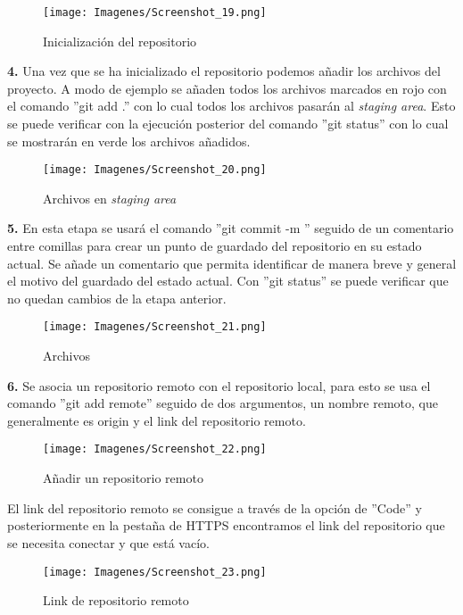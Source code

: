 \begin{figure}[H]
    \centering
    \texttt{[image: Imagenes/Screenshot\_19.png]}
    \caption{Inicialización del repositorio}
    \label{fig:onlinerepo1}
\end{figure}

\noindent \textbf{4.} Una vez que se ha inicializado el repositorio podemos añadir los archivos del proyecto. A modo de ejemplo se añaden todos los archivos marcados en rojo con el comando ''git add .'' con lo cual todos los archivos pasarán al \textit{staging area}. Esto se puede verificar con la ejecución posterior del comando ''git status'' con lo cual se mostrarán en verde los archivos añadidos.

\begin{figure}[H]
    \centering
    \texttt{[image: Imagenes/Screenshot\_20.png]}
    \caption{Archivos en \textit{staging area}}
    \label{fig:onlinerepo1}
\end{figure}

\noindent \textbf{5.} En esta etapa se usará el comando ''git commit -m '' seguido de un comentario entre comillas para crear un punto de guardado del repositorio en su estado actual. Se añade un comentario que permita identificar de manera breve y general el motivo del guardado del estado actual. Con ''git status'' se puede verificar que no quedan cambios de la etapa anterior.

\begin{figure}[H]
    \centering
    \texttt{[image: Imagenes/Screenshot\_21.png]}
    \caption{Archivos}
    \label{fig:onlinerepo1}
\end{figure}

\noindent \textbf{6.} Se asocia un repositorio remoto con el repositorio local, para esto se usa el comando ''git add remote'' seguido de dos argumentos, un nombre remoto, que generalmente es origin y el link del repositorio remoto.

\begin{figure}[H]
    \centering
    \texttt{[image: Imagenes/Screenshot\_22.png]}
    \caption{Añadir un repositorio remoto}
    \label{fig:onlinerepo1}
\end{figure}

El link del repositorio remoto se consigue a través de la opción de ''Code'' y posteriormente en la pestaña de HTTPS encontramos el link del repositorio que se necesita conectar y que está vacío.

\begin{figure}[H]
    \centering
    \texttt{[image: Imagenes/Screenshot\_23.png]}
    \caption{Link de repositorio remoto}
    \label{fig:onlinerepo1}
\end{figure}

